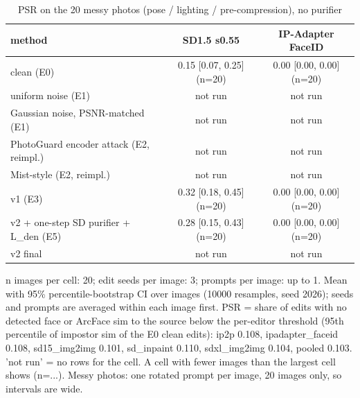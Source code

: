 \begin{table}[t]
\centering
\small
\begin{tabular}{lcc}
\toprule
method & SD1.5 s0.55 & IP-Adapter FaceID \\
\midrule
clean (E0) & 0.15 [0.07, 0.25] (n=20) & 0.00 [0.00, 0.00] (n=20) \\
uniform noise (E1) & not run & not run \\
Gaussian noise, PSNR-matched (E1) & not run & not run \\
PhotoGuard encoder attack (E2, reimpl.) & not run & not run \\
Mist-style (E2, reimpl.) & not run & not run \\
v1 (E3) & 0.32 [0.18, 0.45] (n=20) & 0.00 [0.00, 0.00] (n=20) \\
v2 + one-step SD purifier + L\_den (E5) & 0.28 [0.15, 0.43] (n=20) & 0.00 [0.00, 0.00] (n=20) \\
v2 final & not run & not run \\
\bottomrule
\end{tabular}
\caption{PSR on the 20 messy photos (pose / lighting / pre-compression), no purifier}
\label{tab:messy}
\par\footnotesize n images per cell: 20; edit seeds per image: 3; prompts per image: up to 1. Mean with 95\% percentile-bootstrap CI over images (10000 resamples, seed 2026); seeds and prompts are averaged within each image first. PSR = share of edits with no detected face or ArcFace sim to the source below the per-editor threshold (95th percentile of impostor sim of the E0 clean edits): ip2p 0.108, ipadapter\_faceid 0.108, sd15\_img2img 0.101, sd\_inpaint 0.110, sdxl\_img2img 0.104, pooled 0.103. 'not run' = no rows for the cell. A cell with fewer images than the largest cell shows (n=...). Messy photos: one rotated prompt per image, 20 images only, so intervals are wide.
\end{table}
